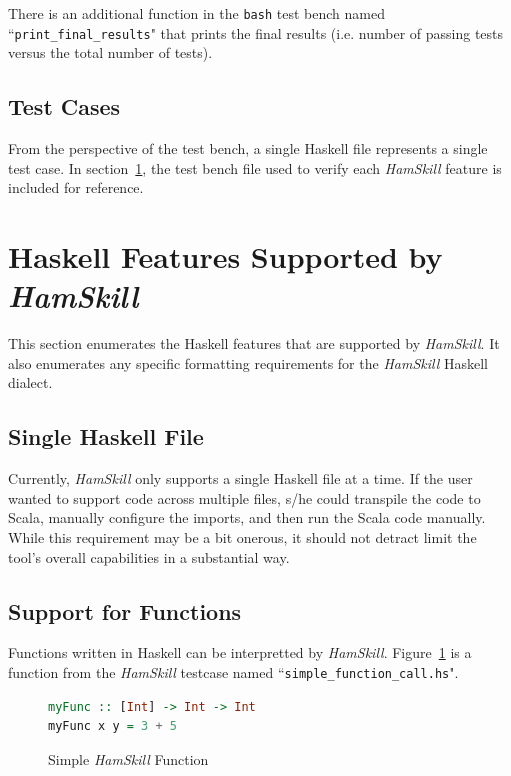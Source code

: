 \documentclass{report}
\begin{document}
There is an additional function in the \texttt{bash} test bench named ``\texttt{print\_final\_results}" that prints the final results (i.e. number of passing tests versus the total number of tests).

\subsection{Test Cases}

From the perspective of the test bench, a single Haskell file represents a single test case.  In section~\ref{sec:hamskillFeatures}, the test bench file used to verify each \textit{HamSkill} feature is included for reference.

\section{Haskell Features Supported by \textit{HamSkill}}\label{sec:hamskillFeatures}

This section enumerates the Haskell features that are supported by \textit{HamSkill}.  It also enumerates any specific formatting requirements for the \textit{HamSkill} Haskell dialect.

\subsection{Single Haskell File}

Currently, \textit{HamSkill} only supports a single Haskell file at a time.  If the user wanted to support code across multiple files, s/he could transpile the code to Scala, manually configure the imports, and then run the Scala code manually.  While this requirement may be a bit onerous, it should not detract limit the tool's overall capabilities in a substantial way.

\subsection{Support for Functions}

Functions written in Haskell can be interpretted by \textit{HamSkill}.  Figure~\ref{fig:myFunctionHaskell} is a function from the \textit{HamSkill} testcase named ``\texttt{simple\_function\_call.hs}".

\begin{figure}[H]
\begin{mdframed}
\begin{lstlisting}[language=Haskell]
myFunc :: [Int] -> Int -> Int
myFunc x y = 3 + 5
\end{lstlisting}
\end{mdframed}
\caption{Simple \textit{HamSkill} Function}\label{fig:myFunctionHaskell}
\end{figure}
\end{document}

